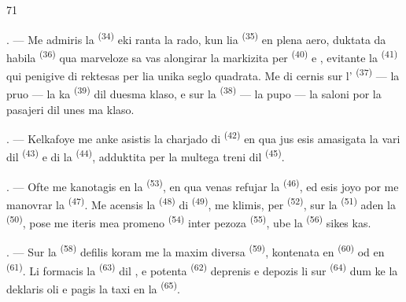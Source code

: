 \begin{VUpage}[73]{71}
\VUsaut{4.0mm}
\VUsaut{3.0mm}

. --- Me admiris la  \textsuperscript{(34)} eki\cc
ranta la rado, kun lia  \textsuperscript{(35)} en plena aero,\nl
duktata da habila  \textsuperscript{(36)} qua marveloze sa\cc
vas alongirar la  markizita per  \textsuperscript{(40)}\nl
e , evitante la  \textsuperscript{(41)} qui penigive di\cc
rektesas per lia unika seglo quadrata. Me di\cc
cernis sur l' \textsuperscript{(37)} --- la pruo --- la ka\cc
{} \textsuperscript{(39)} dil duesma klaso, e sur la  \textsuperscript{(38)}\nl
--- la pupo --- la saloni por la pasajeri dil unes\cc
ma klaso.

. --- Kelkafoye me anke asistis la charjado\nl
di  \textsuperscript{(42)} en qua jus esis amasigata\nl
la vari dil  \textsuperscript{(43)} e di la \cc
{} \textsuperscript{(44)}, adduktita per la multega treni dil \cc
{} \textsuperscript{(45)}.

\VUsaut{3.0mm}
\VUsaut{3.0mm}

. --- Ofte me kanotagis en la  \textsuperscript{(53)},\nl
en qua venas refujar la  \textsuperscript{(46)}, ed esis joyo\nl
por me manovrar la  \textsuperscript{(47)}. Me acensis la\nl
{} \textsuperscript{(48)} di  \textsuperscript{(49)}, me klimis, per\nl
{} \textsuperscript{(52)}, sur la  \textsuperscript{(51)} aden la  \textsuperscript{(50)},\nl
pose me iteris mea promeno  \textsuperscript{(54)} inter\nl
pezoza  \textsuperscript{(55)}, ube la  \textsuperscript{(56)} sikes\cc
kas.

. --- Sur la  \textsuperscript{(58)} defilis koram me la\nl
maxim diversa  \textsuperscript{(59)}, kontenata en  \textsuperscript{(60)}\nl
od en  \textsuperscript{(61)}. Li formacis la  \textsuperscript{(63)} dil\nl
{}, e potenta  \textsuperscript{(62)} deprenis e depozis\nl
li sur  \textsuperscript{(64)} dum ke la \nl
deklaris oli e pagis la taxi en la  \textsuperscript{(65)}.
\end{VUpage}


